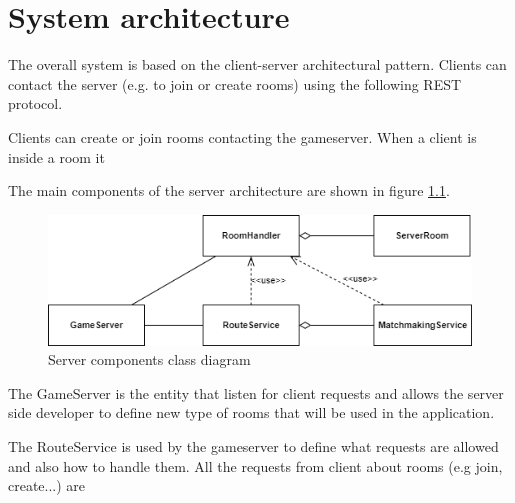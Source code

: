 \chapter{System architecture}
The overall system is based on the client-server architectural pattern. Clients can contact the server (e.g. to join or create rooms) using the following REST protocol.

Clients can create or join rooms contacting the gameserver. When a client is inside a room it 

The main components of the server architecture are shown in figure \ref{fig:server_classes}. 

\begin{figure}[H]
	\includegraphics[scale=0.7]{images/3-architecture/server_architecture-classes.png}
	\caption{Server components class diagram}
	\label{fig:server_classes}
\end{figure}

The GameServer is the entity that listen for client requests and allows the server side developer to define new type of rooms that will be used in the application.


The RouteService is used by the gameserver to define what requests are allowed and also how to handle them. All the requests from client about rooms (e.g join, create...) are 
